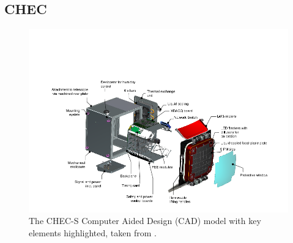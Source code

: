 \subsection{CHEC}
\begin{figure}[ht] 
        \centering \includegraphics[width=\columnwidth]{figures/cam.png}
        \caption{
                \label{fig:cam} %
                The CHEC-S Computer Aided Design (CAD) model with key elements highlighted, taken from \cite{rwhite}.
        }
\end{figure}
